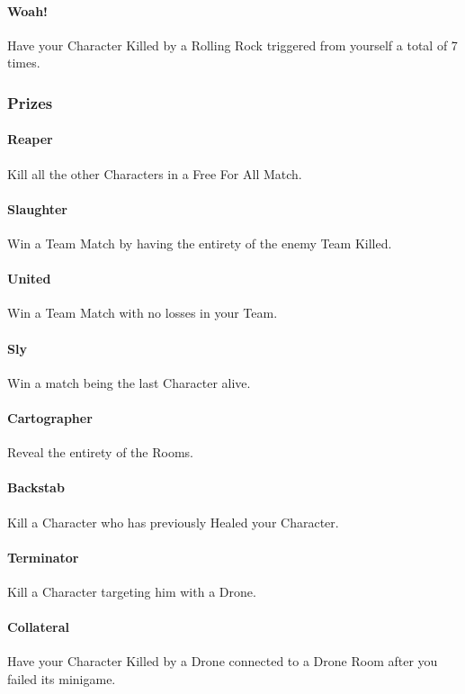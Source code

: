 \paragraph{Woah!} Have your Character Killed by a Rolling Rock triggered from yourself a total of 7 times.

\subsubsection{Prizes}

\paragraph{Reaper} Kill all the other Characters in a Free For All Match.
\paragraph{Slaughter} Win a Team Match by having the entirety of the enemy Team Killed.
\paragraph{United} Win a Team Match with no losses in your Team.
\paragraph{Sly} Win a match being the last Character alive.
\paragraph{Cartographer} Reveal the entirety of the Rooms.
\paragraph{Backstab} Kill a Character who has previously Healed your Character.

\paragraph{Terminator} Kill a Character targeting him with a Drone.
\paragraph{Collateral} Have your Character Killed by a Drone connected to a Drone Room after you failed its minigame.

